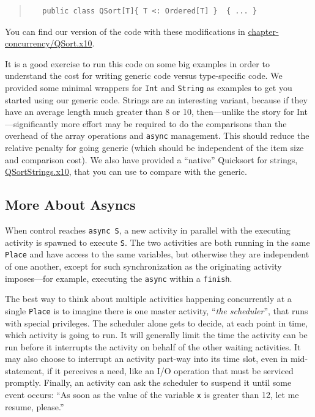 \begin{finepoint}
\begin{quote}
\begin{verbatim}
   public class QSort[T]{ T <: Ordered[T] }  { ... }
\end{verbatim}
\end{quote}

You can find our version of the code with these modifications in 
\href{chapter-concurrency/QSort.x10}{chapter-concur\-ren\-cy/QSort.x10}.

It is a good exercise to run this code on some big examples in order to
understand the cost for writing  generic code versus type-specific code.
We provided some minimal wrappers
for {\tt Int} and {\tt String} as examples to get you started using our generic code. 
Strings are an interesting variant, because if they have an average length much
greater than 8 or 10, then---unlike the story for Int---significantly more effort may be
required to do the comparisons than the
overhead of the array operations and {\tt async} management.  This should reduce
the relative penalty for going generic (which should be independent of the item
size and comparison cost).   We also 
have provided a ``native'' Quicksort for strings, 
\href{chapter-concurrency/QSortStrings.x10}{QSortStrings.x10},
that you can use to compare with the generic.
\end{finepoint}
\subsection{More About Asyncs}\label{ssec:moreasyncs}

When control reaches {\tt async S}, a new
activity in parallel with the executing activity is spawned to execute {\tt S}.
The two activities are both running in the same {\tt Place}  and have access
to the same variables, but otherwise they are
independent of one another, except for such synchronization as the originating
activity imposes---for example, executing the {\tt async} within a {\tt finish}.

The best way to think about multiple activities happening concurrently at a
single {\tt Place} is to imagine there is one master activity, ``{\em the scheduler}'', 
that runs with special privileges.  The
scheduler alone gets to decide, at each point in time, which activity is going to run.
It will generally limit the time the activity can be run before it interrupts
the activity on behalf of the other waiting activities.  It may also choose to interrupt an
activity part-way into its time slot, even in mid-statement, if it perceives a need, like
an I/O operation that must be serviced promptly.  Finally, an activity can ask the
scheduler to suspend it until some event occurs: ``As soon as the value of
the variable {\tt x} is greater than 12, let me resume, please.'' 

